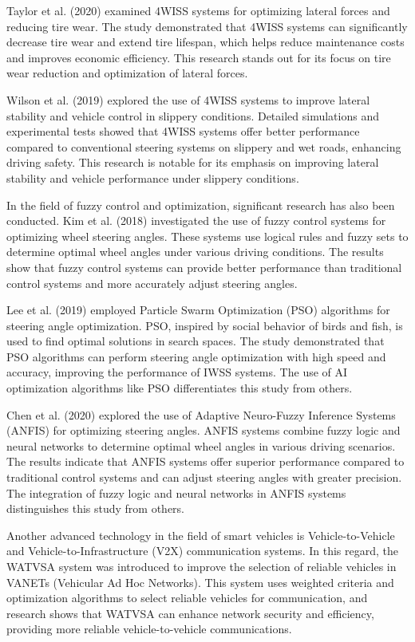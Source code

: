 \documentclass[a4paper,10pt]{article}
\begin{document}
        Taylor et al. (2020) examined 4WISS systems for optimizing lateral forces and reducing tire wear. The study demonstrated that 4WISS systems can significantly decrease tire wear and extend tire lifespan, which helps reduce maintenance costs and improves economic efficiency. This research stands out for its focus on tire wear reduction and optimization of lateral forces.

        Wilson et al. (2019) explored the use of 4WISS systems to improve lateral stability and vehicle control in slippery conditions. Detailed simulations and experimental tests showed that 4WISS systems offer better performance compared to conventional steering systems on slippery and wet roads, enhancing driving safety. This research is notable for its emphasis on improving lateral stability and vehicle performance under slippery conditions.

        In the field of fuzzy control and optimization, significant research has also been conducted. Kim et al. (2018) investigated the use of fuzzy control systems for optimizing wheel steering angles. These systems use logical rules and fuzzy sets to determine optimal wheel angles under various driving conditions. The results show that fuzzy control systems can provide better performance than traditional control systems and more accurately adjust steering angles.

        Lee et al. (2019) employed Particle Swarm Optimization (PSO) algorithms for steering angle optimization. PSO, inspired by social behavior of birds and fish, is used to find optimal solutions in search spaces. The study demonstrated that PSO algorithms can perform steering angle optimization with high speed and accuracy, improving the performance of IWSS systems. The use of AI optimization algorithms like PSO differentiates this study from others.

        Chen et al. (2020) explored the use of Adaptive Neuro-Fuzzy Inference Systems (ANFIS) for optimizing steering angles. ANFIS systems combine fuzzy logic and neural networks to determine optimal wheel angles in various driving scenarios. The results indicate that ANFIS systems offer superior performance compared to traditional control systems and can adjust steering angles with greater precision. The integration of fuzzy logic and neural networks in ANFIS systems distinguishes this study from others.

        Another advanced technology in the field of smart vehicles is Vehicle-to-Vehicle and Vehicle-to-Infrastructure (V2X) communication systems. In this regard, the WATVSA system was introduced to improve the selection of reliable vehicles in VANETs (Vehicular Ad Hoc Networks). This system uses weighted criteria and optimization algorithms to select reliable vehicles for communication, and research shows that WATVSA can enhance network security and efficiency, providing more reliable vehicle-to-vehicle communications.
\end{document}
